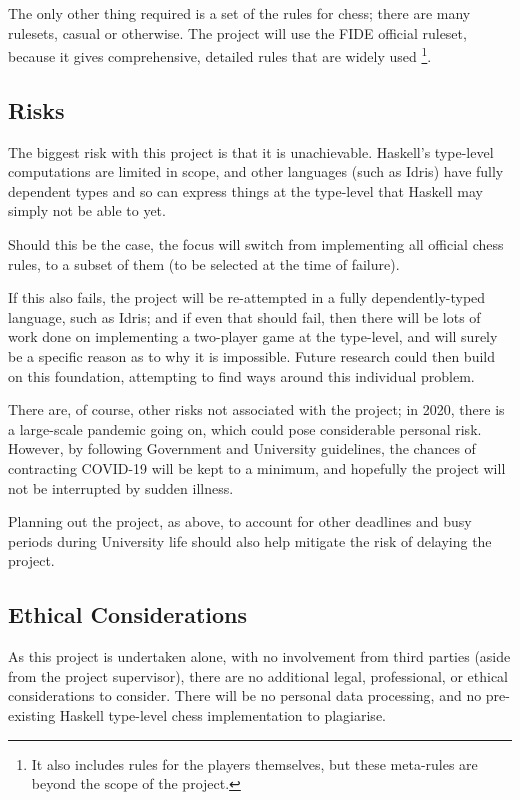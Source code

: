 \documentclass[12pt, a4paper]{scrartcl}
\begin{document}
The only other thing required is a set of the rules for chess; there are many rulesets, casual or otherwise. The project will use the FIDE official ruleset, because it gives comprehensive, detailed rules that are widely used \footnote{It also includes rules for the players themselves, but these meta-rules are beyond the scope of the project.}.

\subsection{Risks}

The biggest risk with this project is that it is unachievable. Haskell's type-level computations are limited in scope, and other languages (such as Idris) have fully dependent types and so can express things at the type-level that Haskell may simply not be able to yet.

Should this be the case, the focus will switch from implementing all official chess rules, to a subset of them (to be selected at the time of failure).

If this also fails, the project will be re-attempted in a fully dependently-typed language, such as Idris; and if even that should fail, then there will be lots of work done on implementing a two-player game at the type-level, and will surely be a specific reason as to why it is impossible. Future research could then build on this foundation, attempting to find ways around this individual problem.

There are, of course, other risks not associated with the project; in 2020, there is a large-scale pandemic going on, which could pose considerable personal risk. However, by following Government and University guidelines, the chances of contracting COVID-19 will be kept to a minimum, and hopefully the project will not be interrupted by sudden illness.

Planning out the project, as above, to account for other deadlines and busy periods during University life should also help mitigate the risk of delaying the project.

\subsection{Ethical Considerations}

As this project is undertaken alone, with no involvement from third parties (aside from the project supervisor), there are no additional legal, professional, or ethical considerations to consider. There will be no personal data processing, and no pre-existing Haskell type-level chess implementation to plagiarise.
\end{document}
